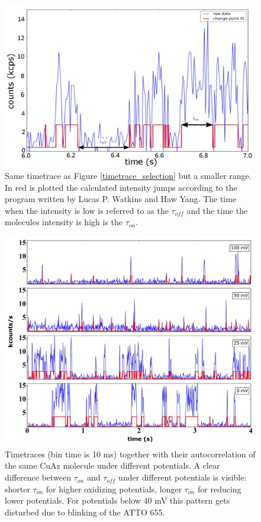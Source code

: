 \documentclass[twoside,single]{lion-msc}
\begin{document}
\begin{figure}[ht!]
\centering
\includegraphics[width=\textwidth]{on_off_test1}
\caption{Same timetrace as Figure \ref{timetrace_selection} but a smaller range. In red is plotted the calculated intensity jumps according to the program written by Lucas P. Watkins and Haw Yang. The time when the intensity is low is referred to as the $\tau_{off}$ and the time the molecules intensity is high is the $\tau_{on}$.}
\label{on_off_times}
\end{figure}

\newpage


\begin{figure}[ht!]
\centering
\includegraphics[width=1\textwidth]{plots_timetraces_diff_pot}
\caption{Timetraces (bin time is 10 ms) together with their autocorrelation of the same CuAz molecule under different potentials. A clear difference between $\tau_{on}$ and $\tau_{off}$ under different potentials is visible: shorter $\tau_{on}$ for higher oxidizing potentials, longer $\tau_{on}$ for reducing lower potentials. For potentials below 40 mV this pattern gets disturbed due to blinking of the ATTO 655.}
\label{plots_timetraces_diff_pot}
\end{figure}
\end{document}
